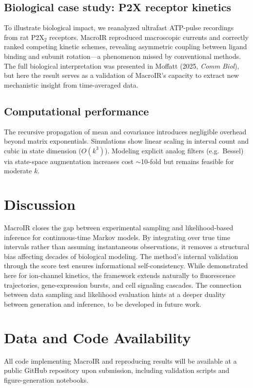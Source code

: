 \documentclass[9pt]{elife}
\begin{document}
\subsection*{Biological case study: P2X receptor kinetics}
To illustrate biological impact, we reanalyzed ultrafast ATP-pulse recordings from rat P2X$_2$ receptors. MacroIR reproduced macroscopic currents and correctly ranked competing kinetic schemes, revealing asymmetric coupling between ligand binding and subunit rotation---a phenomenon missed by conventional methods. The full biological interpretation was presented in Moffatt (2025, \emph{Comm Biol}), but here the result serves as a validation of MacroIR’s capacity to extract new mechanistic insight from time-averaged data.

\subsection*{Computational performance}
The recursive propagation of mean and covariance introduces negligible overhead beyond matrix exponentials. Simulations show linear scaling in interval count and cubic in state dimension ($O(k^3)$). Modeling explicit analog filters (e.g.\ Bessel) via state-space augmentation increases cost $\sim$10-fold but remains feasible for moderate $k$.

\section*{Discussion}
MacroIR closes the gap between experimental sampling and likelihood-based inference for continuous-time Markov models. By integrating over true time intervals rather than assuming instantaneous observations, it removes a structural bias affecting decades of biological modeling. The method’s internal validation through the score test ensures informational self-consistency. While demonstrated here for ion-channel kinetics, the framework extends naturally to fluorescence trajectories, gene-expression bursts, and cell signaling cascades. The connection between data sampling and likelihood evaluation hints at a deeper duality between generation and inference, to be developed in future work.

\section*{Data and Code Availability}
All code implementing MacroIR and reproducing results will be available at a public GitHub repository upon submission, including validation scripts and figure-generation notebooks.
\end{document}
